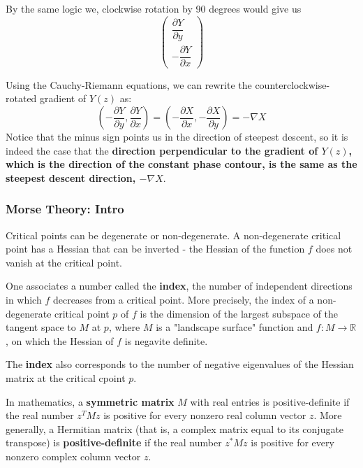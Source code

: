 By the same logic we, clockwise rotation by 90 degrees would give us
$$
\begin{pmatrix}
    \dfrac{\partial Y}{\partial y} \\[1em]
    -\dfrac{\partial Y}{\partial x}
\end{pmatrix}
$$


Using the Cauchy-Riemann equations, we can rewrite the counterclockwise-rotated gradient of $Y(z)$ as:
$$
\left( -\frac{\partial Y}{\partial y}, \frac{\partial Y}{\partial x}\right)
= \left(-\frac{\partial X}{\partial x}, -\frac{\partial X}{\partial y}\right) = -\nabla X
$$
Notice that the minus sign points us in the direction of steepest descent,
so it is indeed the case that the \textbf{direction perpendicular to the gradient of $Y(z)$,
which is the direction of the constant phase contour,
is the same as the steepest descent direction, $-\nabla X$}.







\subsubsection{Morse Theory: Intro}

Critical points can be degenerate or non-degenerate.
A non-degenerate critical point has a Hessian that can be inverted - the Hessian of the function $f$ does not vanish
at the critical point.

One associates a number called the \textbf{index}, the number of independent directions in which
$f$ decreases from a critical point.
More precisely, the index of a non-degenerate critical point $p$ of $f$ is the dimension of the largest subspace
of the tangent space to $M$ at $p$, where $M$ is a "landscape surface" function and $f : M \rightarrow \mathbb{R}$,
on which the Hessian of $f$ is negavite definite.

The \textbf{index} also corresponds to the number of negative eigenvalues of the Hessian matrix at the critical cpoint $p$.


In mathematics, a \textbf{symmetric matrix} $M$ with real entries is positive-definite if the real number $z^T M z$
is positive for every nonzero real column vector $z$.
More generally, a Hermitian matrix (that is, a complex matrix equal to its conjugate transpose) is \textbf{positive-definite}
if the real number $z^* M z$ is positive for every nonzero complex column vector $z$.



